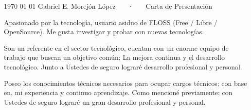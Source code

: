 \documentclass[11pt, a4paper]{awesome-cv}
\begin{document}
\makecvheader[R]

\makecvfooter
  {\today}
  {Gabriel E. Morejón López ~~~·~~~ Carta de Presentación}
  {}

\makelettertitle

\begin{cvletter}

Apasionado por la tecnología, usuario asiduo de FLOSS (Free / Libre / OpenSource). Me gusta investigar y probar con nuevas tecnologías.

Son un referente en el sector tecnológico, cuentan con un enorme equipo de trabajo que buscan un objetivo común; La mejora continua y el desarrollo tecnológico. Junto a Ustedes de seguro lograré desarrollo profesional y personal.

Poseo los conocimientos técnicos necesarios para ocupar cargos técnicos; con base en, mi experiencia y continuo aprendizaje. Como mencioné previamente; con Ustedes de seguro lograré un gran desarrollo profesional y personal.

\end{cvletter}


\makeletterclosing
\end{document}
